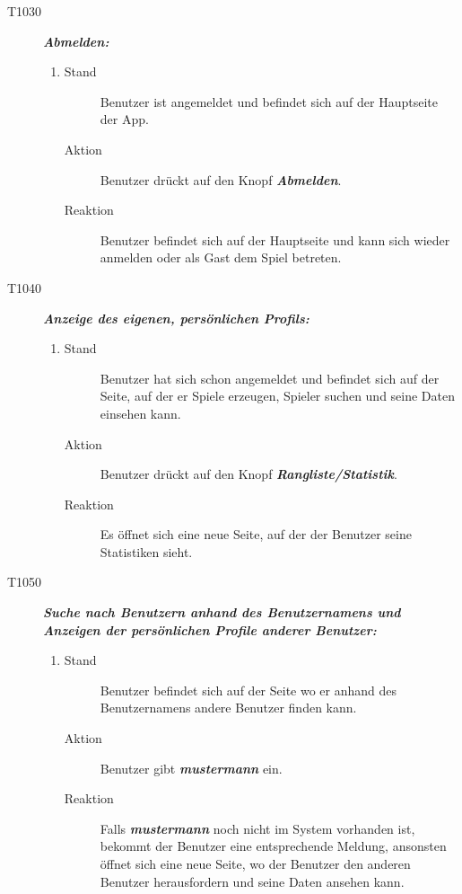 \documentclass[parskip=full]{scrartcl}
\begin{document}
\begin{description}
\begin{enumerate}
	\end{enumerate}
	\item[T1030] \textbf{\textit{Abmelden: }} 
	\begin{enumerate}
		\item 
		\begin{description}
			\item[Stand] Benutzer ist angemeldet und befindet sich auf der Hauptseite der App.
			\item[Aktion] Benutzer drückt auf den Knopf \textbf{\textit{Abmelden}}.
			\item[Reaktion] Benutzer befindet sich auf der Hauptseite und kann sich wieder anmelden oder als Gast dem Spiel betreten.
		\end{description}
	\end{enumerate}
	
	\item[T1040] \textbf{\textit{Anzeige des eigenen, persönlichen Profils: }} 
	\begin{enumerate}
		\item 
		\begin{description}
			\item[Stand] Benutzer hat sich schon angemeldet und befindet sich auf der Seite, auf der er Spiele erzeugen, Spieler suchen und seine Daten einsehen kann.
			\item[Aktion] Benutzer drückt auf den Knopf \textbf{\textit{Rangliste/Statistik}}.
			\item[Reaktion] Es öffnet sich eine neue Seite, auf der der Benutzer seine Statistiken sieht.
		\end{description}
	\end{enumerate}
	
	\item[T1050] \textbf{\textit{Suche nach Benutzern anhand des Benutzernamens und Anzeigen der persönlichen Profile anderer Benutzer: }} 
	\begin{enumerate}
		\item 
		\begin{description}
			\item[Stand] Benutzer befindet sich auf der Seite wo er anhand des Benutzernamens andere Benutzer finden kann.
			\item[Aktion] Benutzer gibt \textbf{\textit{mustermann }}ein.
			\item[Reaktion] Falls \textbf{\textit{mustermann }}noch nicht im System vorhanden ist, bekommt der Benutzer eine entsprechende Meldung, ansonsten öffnet sich eine neue Seite, wo der Benutzer den anderen Benutzer herausfordern und seine Daten ansehen kann.
		\end{description}
	\end{enumerate}
	

\end{description}
\end{document}
